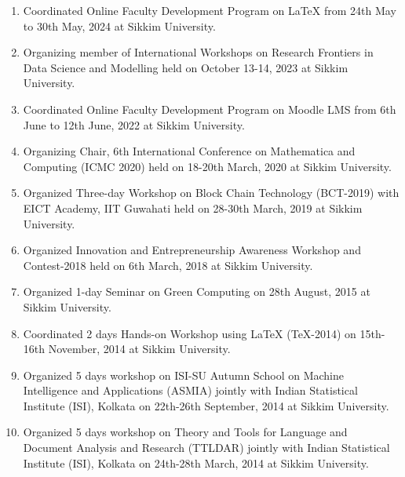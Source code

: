 \documentclass[11pt,a4paper]{moderncv}
\begin{document}
\begin{adjustwidth}{6em}{0pt}
	\begin{enumerate}
		\item Coordinated Online Faculty Development Program on LaTeX from 24th May to 30th May, 2024 at Sikkim University.
		
		\item Organizing member of International Workshops on Research Frontiers in Data Science and Modelling held on October 13-14, 2023 at Sikkim University.
		
		\item Coordinated Online Faculty Development Program on Moodle LMS from 6th June to 12th June, 2022 at Sikkim University.
		
		\item Organizing Chair, 6th International Conference on Mathematica and Computing (ICMC 2020) held on 18-20th March, 2020 at Sikkim University.
		
		\item Organized Three-day Workshop on Block Chain Technology (BCT-2019) with EICT Academy, IIT Guwahati held on 28-30th March, 2019 at Sikkim University.
		
		\item Organized Innovation and Entrepreneurship Awareness Workshop and Contest-2018 held on 6th March, 2018 at Sikkim University.
		
		\item Organized 1-day Seminar on Green Computing on 28th August, 2015 at Sikkim University.
		
		\item Coordinated 2 days Hands-on Workshop using LaTeX (TeX-2014) on 15th-16th November, 2014 at Sikkim University.
		
		\item Organized 5 days workshop on ISI-SU Autumn School on Machine Intelligence and Applications (ASMIA) jointly with Indian Statistical Institute (ISI), Kolkata on 22th-26th September, 2014 at Sikkim University.
		
		\item Organized 5 days workshop on Theory and Tools for Language and Document Analysis and Research (TTLDAR) jointly with Indian Statistical Institute (ISI), Kolkata on 24th-28th March, 2014 at Sikkim University.
		
	\end{enumerate}
\end{adjustwidth}
\end{document}
